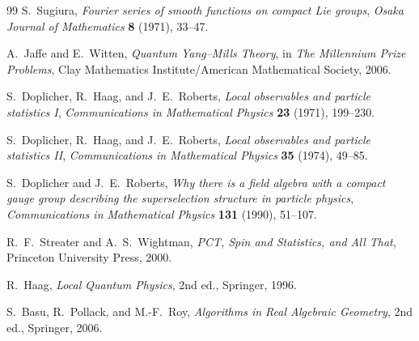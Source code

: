 \begin{thebibliography}{99}
S.~Sugiura,
\newblock \emph{Fourier series of smooth functions on compact Lie groups},
\newblock \emph{Osaka Journal of Mathematics} \textbf{8} (1971), 33--47.

A.~Jaffe and E.~Witten,
\newblock \emph{Quantum Yang--Mills Theory},
\newblock in \emph{The Millennium Prize Problems}, Clay Mathematics Institute/American Mathematical Society, 2006.

S.~Doplicher, R.~Haag, and J.~E.~Roberts,
\newblock \emph{Local observables and particle statistics I},
\newblock \emph{Communications in Mathematical Physics} \textbf{23} (1971), 199--230.

S.~Doplicher, R.~Haag, and J.~E.~Roberts,
\newblock \emph{Local observables and particle statistics II},
\newblock \emph{Communications in Mathematical Physics} \textbf{35} (1974), 49--85.

S.~Doplicher and J.~E.~Roberts,
\newblock \emph{Why there is a field algebra with a compact gauge group describing the superselection structure in particle physics},
\newblock \emph{Communications in Mathematical Physics} \textbf{131} (1990), 51--107.

R.~F.~Streater and A.~S.~Wightman,
\newblock \emph{PCT, Spin and Statistics, and All That},
\newblock Princeton University Press, 2000.

R.~Haag,
\newblock \emph{Local Quantum Physics},
\newblock 2nd ed., Springer, 1996.

S.~Basu, R.~Pollack, and M.-F.~Roy,
\newblock \emph{Algorithms in Real Algebraic Geometry},
\newblock 2nd ed., Springer, 2006.

\end{thebibliography}
